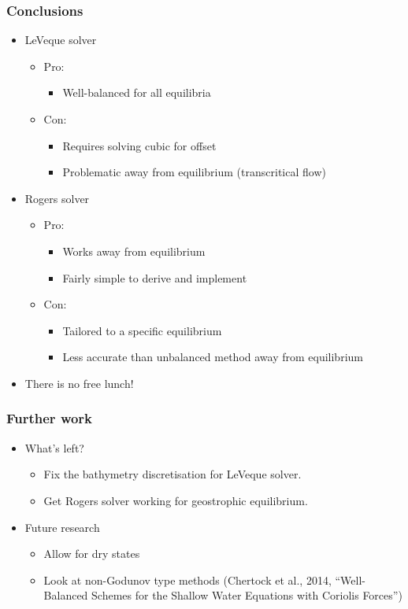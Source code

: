 \documentclass[handout]{beamer}
\begin{document}
\begin{frame}
  \frametitle{Conclusions}
  \begin{itemize}
    \item LeVeque solver
    \begin{itemize}
      \item Pro:
      \begin{itemize}
        \item Well-balanced for all equilibria
      \end{itemize}
      \item Con:
      \begin{itemize}
        \item Requires solving cubic for offset
        \item Problematic away from equilibrium (transcritical flow)
      \end{itemize}
    \end{itemize}
    \pause
    \item Rogers solver
    \begin{itemize}
      \item Pro:
      \begin{itemize}
        \item Works away from equilibrium
        \item Fairly simple to derive and implement
      \end{itemize}
      \item Con:
      \begin{itemize}
        \item Tailored to a specific equilibrium
        \item Less accurate than unbalanced method away from equilibrium
      \end{itemize}
    \end{itemize}
    \pause
    \item There is no free lunch!
  \end{itemize}
\end{frame}

\begin{frame}
  \frametitle{Further work}
  \begin{itemize}
    \item What's left?
    \begin{itemize}
      \item Fix the bathymetry discretisation for LeVeque solver.
      \item Get Rogers solver working for geostrophic equilibrium.
    \end{itemize}
    \pause
    \item Future research
    \begin{itemize}
      \item Allow for dry states
      \item Look at non-Godunov type methods (Chertock et al., 2014, ``Well-Balanced Schemes for the Shallow Water Equations with Coriolis Forces'')
    \end{itemize}
  \end{itemize}
\end{frame}
\end{document}
